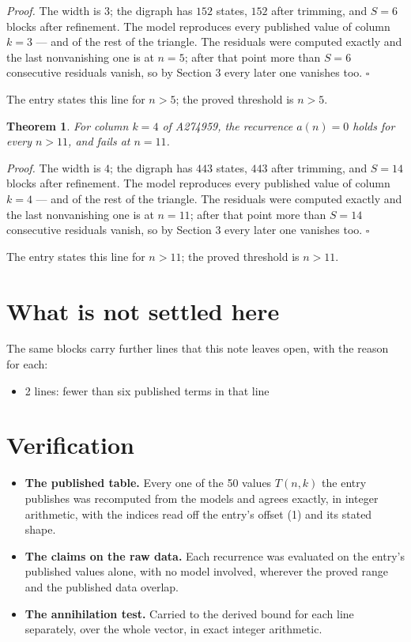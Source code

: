 \documentclass[11pt]{article}
\newtheorem{theorem}{Theorem}
\theoremstyle{definition}
\begin{document}
{\itshape Proof.} The width is $3$; the digraph has $152$ states, $152$ after trimming, and $S = 6$ blocks after refinement. The model reproduces every published value of column $k = 3$ --- and of the rest of the triangle. The residuals were computed exactly and the last nonvanishing one is at $n = 5$; after that point more than $S = 6$ consecutive residuals vanish, so by Section 3 every later one vanishes too. $\square$

The entry states this line for $n > 5$; the proved threshold is $n > 5$.

\begin{theorem} For column $k = 4$ of A274959, the recurrence $a(n) = 0$ holds for every $n > 11$, and fails at $n = 11$.\end{theorem}

{\itshape Proof.} The width is $4$; the digraph has $443$ states, $443$ after trimming, and $S = 14$ blocks after refinement. The model reproduces every published value of column $k = 4$ --- and of the rest of the triangle. The residuals were computed exactly and the last nonvanishing one is at $n = 11$; after that point more than $S = 14$ consecutive residuals vanish, so by Section 3 every later one vanishes too. $\square$

The entry states this line for $n > 11$; the proved threshold is $n > 11$.

\section{What is not settled here}

The same blocks carry further lines that this note leaves open, with the reason for each:

\begin{itemize}

\item 2 lines: fewer than six published terms in that line

\end{itemize}

\section{Verification}

\begin{itemize}

\item {\bfseries The published table.} Every one of the 50 values $T(n,k)$ the entry publishes was recomputed from the models and agrees exactly, in integer arithmetic, with the indices read off the entry's offset (1) and its stated shape.

\item {\bfseries The claims on the raw data.} Each recurrence was evaluated on the entry's published values alone, with no model involved, wherever the proved range and the published data overlap.

\item {\bfseries The annihilation test.} Carried to the derived bound for each line separately, over the whole vector, in exact integer arithmetic.

\end{itemize}
\end{document}
